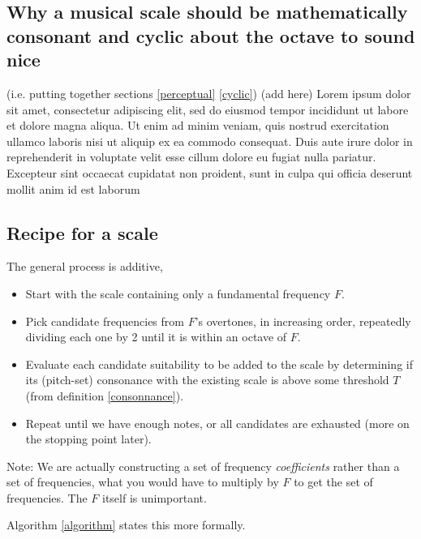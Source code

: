 \documentclass[letterpaper]{article}
\theoremstyle{definition}
\begin{document}
{\subsection{Why a musical scale should be mathematically consonant and cyclic about the octave to sound nice}
(i.e. putting together sections \ref{perceptual} \ref{cyclic})
(add here)
Lorem ipsum dolor sit amet, consectetur adipiscing elit, sed do eiusmod tempor incididunt ut labore et dolore magna aliqua. Ut enim ad minim veniam, quis nostrud exercitation ullamco laboris nisi ut aliquip ex ea commodo consequat. Duis aute irure dolor in reprehenderit in voluptate velit esse cillum dolore eu fugiat nulla pariatur. Excepteur sint occaecat cupidatat non proident, sunt in culpa qui officia deserunt mollit anim id est laborum






\subsection{Recipe for a scale}

The general process is additive, 
\begin{itemize}
  \item Start with the scale containing only a fundamental frequency $F$.
  \item Pick candidate frequencies from $F$'s overtones, in increasing order, repeatedly dividing each one by 2 until it is within an octave of $F$.  
  \item Evaluate each candidate suitability to be added to the scale by determining if its (pitch-set) consonance with the existing scale is above some threshold $T$ (from definition \ref{consonnance}).
  \item Repeat until we have enough notes, or all candidates are exhausted (more on the stopping point later).  
\end{itemize}

Note: We are actually constructing a set of frequency \emph{coefficients} rather than a set of frequencies, what you would have to multiply by $F$ to get the set of frequencies.  The $F$ itself is unimportant.

\medskip
Algorithm \ref{algorithm} states this more formally.

\medskip
\begin{algorithm}[H]
\label{algorithm}
\SetAlgoLined




\end{algorithm}}
\end{document}
